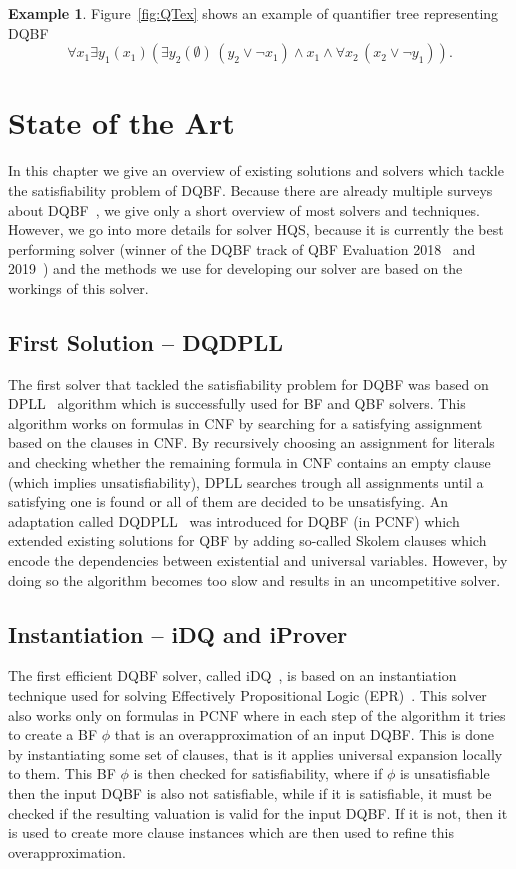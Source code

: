 \documentclass[
  digital, %
  color,
  twoside, %
  table,   %
  nolof,     %
  nolot,     %
]{fithesis3}
\theoremstyle{definition}
\newtheorem{example}{Example}
\theoremstyle{remark}
\newcommand{\itholds}{\,}
\begin{document}
\begin{example}
  Figure~\ref{fig:QTex} shows an example of quantifier tree representing DQBF \[\forall x_1 \exists y_1(x_1) (\exists y_2(\emptyset) \itholds (y_2 \lor \neg x_1) \land x_1 \land \forall x_2 \itholds (x_2 \lor \neg y_1)).\]
\end{example}

\chapter{State of the Art}
In this chapter we give an overview of existing solutions and solvers which tackle the satisfiability problem of DQBF. Because there are already multiple surveys about DQBF~\cite{DQBFStateOfArtTalk,DQBFStateOfArt,DQBFStateOfArtNew}, we give only a short overview of most solvers and techniques. However, we go into more details for solver HQS, because it is currently the best performing solver (winner of the DQBF track of QBF Evaluation 2018~\cite{QBFeval18} and 2019~\cite{QBFeval19}) and the methods we use for developing our solver are based on the workings of this solver.

\section{First Solution -- DQDPLL}
The first solver that tackled the satisfiability problem for DQBF was based on DPLL~\cite{DPLL} algorithm which is successfully used for BF and QBF solvers. This algorithm works on formulas in CNF by searching for a satisfying assignment based on the clauses in CNF. By recursively choosing an assignment for literals and checking whether the remaining formula in CNF contains an empty clause (which implies unsatisfiability), DPLL searches trough all assignments until a satisfying one is found or all of them are decided to be unsatisfying. An adaptation called DQDPLL~\cite{DPLLalgorithm} was introduced for DQBF (in PCNF) which extended existing solutions for QBF by adding so-called Skolem clauses which encode the dependencies between existential and universal variables. However, by doing so the algorithm becomes too slow and results in an uncompetitive solver.

\section{Instantiation -- iDQ and iProver}
The first efficient DQBF solver, called iDQ~\cite{iDQandDQDIMACS}, is based on an instantiation technique used for solving Effectively Propositional Logic (EPR)~\cite{iProver}. This solver also works only on formulas in PCNF where in each step of the algorithm it tries to create a BF $\phi$ that is an overapproximation of an input DQBF. This is done by instantiating some set of clauses, that is it applies universal expansion locally to them. This BF $\phi$ is then checked for satisfiability, where if $\phi$ is unsatisfiable then the input DQBF is also not satisfiable, while if it is satisfiable, it must be checked if the resulting valuation is valid for the input DQBF. If it is not, then it is used to create more clause instances which are then used to refine this overapproximation.
\end{document}
